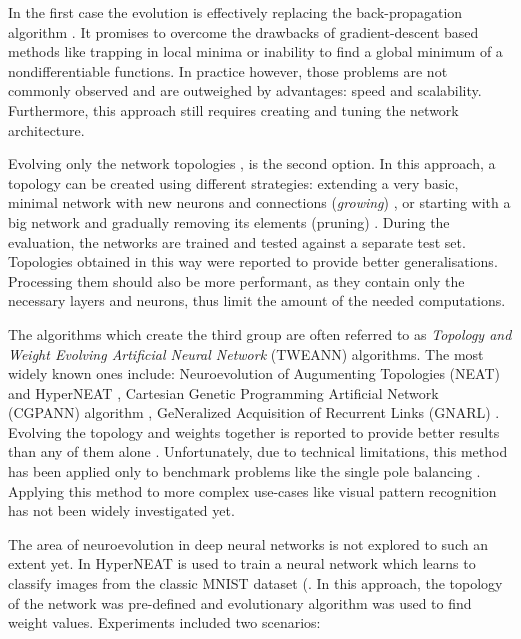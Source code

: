 \documentclass{llncs}
\begin{document}
In the first case the evolution is effectively replacing the back-propagation algorithm \cite{Montana1989}. It promises to overcome the drawbacks of gradient-descent based methods like trapping in local minima or inability to find a global minimum of a nondifferentiable functions. In practice however, those problems are not commonly observed and are outweighed by advantages: speed and scalability. Furthermore, this approach still requires creating and tuning the network architecture.

Evolving only the network topologies \cite{Mandischer1995}, \cite{Kitano1990} is the second option. In this approach, a topology can be created using different strategies: extending a very basic, minimal network with new neurons and connections (\emph{growing}) \cite{Stanley2002}, \cite{Xinjian2010} or starting with a big network and gradually removing its elements (pruning) \cite{Siebel2009}. During the evaluation, the networks are trained and tested against a separate test set. Topologies obtained in this way were reported to provide better generalisations. Processing them should also be more performant, as they contain only the necessary layers and neurons, thus limit the amount of the needed computations.

The algorithms which create the third group are often referred to as \emph{Topology and Weight Evolving Artificial Neural Network} (TWEANN) algorithms. The most widely known ones include: Neuroevolution of Augumenting Topologies (NEAT) \cite{Stanley2002} and HyperNEAT \cite{Stanley2009}, Cartesian Genetic Programming Artificial Network (CGPANN) algorithm \cite{Khan2010}, GeNeralized Acquisition of Recurrent Links (GNARL) \cite{Angeline1994}. Evolving the topology and weights together is reported to provide better results than any of them alone \cite{XinYao1999}. Unfortunately, due to technical limitations, this method has been applied only to benchmark problems like the single pole balancing \cite{Khan2010}. Applying this method to more complex use-cases like visual pattern recognition has not been widely investigated yet.

The area of neuroevolution in deep neural networks is not explored to such an extent yet. In \cite{Verbancsics2013} HyperNEAT is used to train a neural network which learns to classify images from the classic MNIST dataset (\cite{lecun-mnisthandwrittendigit-2010}. In this approach, the topology of the network was pre-defined and evolutionary algorithm was used to find weight values. Experiments included two scenarios: 
\end{document}
